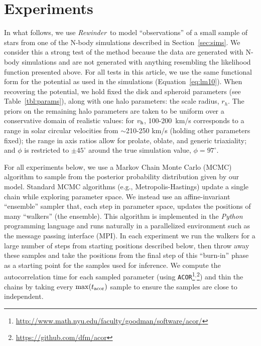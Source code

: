 \documentclass[letterpaper,12pt,preprint]{aastex}
\newcommand{\project}[1]{\textsl{#1}}
\newcommand{\vhalo}{v_{\rm h}}
\newcommand{\rewinder}{\emph{Rewinder}}
\begin{document}
\section{Experiments} \label{sec:experiments}
In what follows, we use \rewinder\ to model ``observations'' of a small sample of stars from one of the N-body simulations described in Section~\ref{sec:sims}. We consider this a strong test of the method because the data are generated with N-body simulations and are not generated with anything resembling the likelihood function presented above. For all tests in this article, we use the same functional form for the potential as used in the simulations (Equation~\ref{eq:lm10}). When recovering the potential, we hold fixed the disk and spheroid parameters (see Table~\ref{tbl:params}), along with one halo parameters: the scale radius, $r_h$. The priors on the remaining halo parameters are taken to be uniform over a conservative domain of realistic values: for $\vhalo$, 100-200~km/s corresponds to a range in solar circular velocities from $\sim$210-250 km/s (holding other parameters fixed); the range in axis ratios allow for prolate, oblate, and generic triaxiality; and $\phi$ is restricted to $\pm45^\circ$ around the true simulation value, $\phi = 97^\circ$.

For all experiments below, we use a Markov Chain Monte Carlo (MCMC) algorithm to sample from the posterior probability distribution given by our model. Standard MCMC algorithms (e.g., Metropolis-Hastings) update a single chain while exploring parameter space. We instead use an affine-invariant ``ensemble'' sampler \citep{goodman10} that, each step in parameter space, updates the positions of many ``walkers'' (the ensemble). This algorithm is implemented in the \project{Python} programming language \citep{foremanmackey13} and runs naturally in a parallelized environment such as the message passing interface (MPI). In each experiment we run the walkers for a large number of steps from starting positions described below, then throw away these samples and take the positions from the final step of this ``burn-in'' phase as a starting point for the samples used for inference. We compute the autocorrelation time for each sampled parameter (using \texttt{ACOR}\footnote{\url{http://www.math.nyu.edu/faculty/goodman/software/acor/}}$^{,}$\footnote{\url{https://github.com/dfm/acor}}) and thin the chains by taking every $\mathrm{max}(t_{\rm acor})$ sample to ensure the samples are close to independent.
\end{document}
